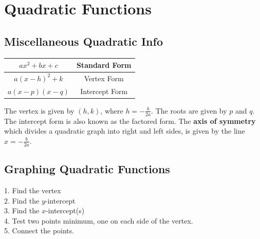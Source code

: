 \section{Quadratic Functions}

    \subsection{Miscellaneous Quadratic Info}
        \begin{center}
            \begin{tabular}{|c|c|}
                \hline
                $ax^2+bx+c$   & Standard Form  \\
                \hline
                $a(x-h)^2+k$  & Vertex Form    \\
                \hline
                $a(x-p)(x-q)$ & Intercept Form \\
                \hline
            \end{tabular}
        \end{center}

        \noindent The vertex is given by $(h,k)$, where $h=-\frac{b}{2a}$. The roots are given
        by $p$ and $q$. The intercept form is also known as the factored form. The
        \textbf{axis of symmetry} which divides a quadratic graph into right and left sides,
        is given by the line $x=-\frac{b}{2a}$.



    \subsection{Graphing Quadratic Functions}
        1. Find the vertex \\
        2. Find the $y$-intercept \\
        3. Find the $x$-intercept(s) \\
        4. Test two points minimum, one on each side of the vertex. \\
        5. Connect the points.

        \begin{center}
        \end{center}



